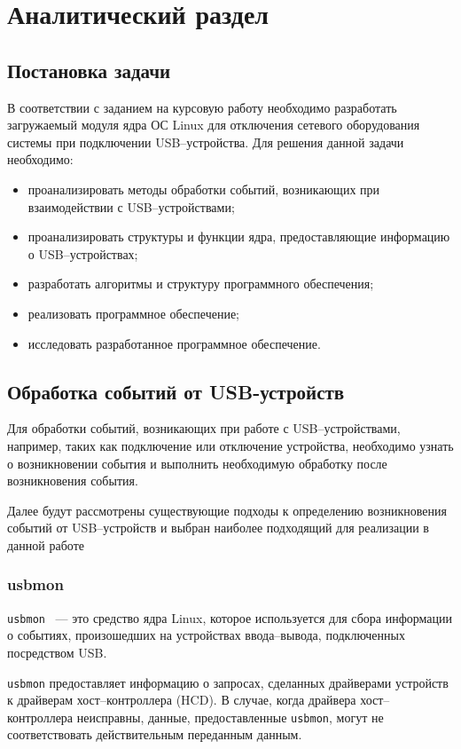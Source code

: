 \chapter{Аналитический раздел}

\section{Постановка задачи}

В соответствии с заданием на курсовую работу необходимо разработать загружаемый модуля ядра ОС Linux для отключения сетевого оборудования системы при подключении USB–устройства. Для решения данной задачи необходимо:

\begin{itemize}
	\item проанализировать методы обработки событий, возникающих при взаимодействии с USB–устройствами;
	\item проанализировать структуры и функции ядра, предоставляющие информацию о USB–устройствах;
	\item разработать алгоритмы и структуру программного обеспечения;
	\item реализовать программное обеспечение;
	\item исследовать разработанное программное обеспечение.
\end{itemize}

\section{Обработка событий от USB-устройств}

Для обработки событий, возникающих при работе с USB–устройствами, например, таких как подключение или отключение устройства, необходимо узнать о возникновении события и выполнить необходимую обработку после возникновения события.

Далее будут рассмотрены существующие подходы к определению возникновения событий от USB–устройств и выбран наиболее подходящий для реализации в данной работе

\subsection{usbmon}

\texttt{usbmon}~\cite{usbmon} --- это средство ядра Linux, которое используется для сбора информации о событиях, произошедших на устройствах ввода--вывода, подключенных посредством USB.

\texttt{usbmon} предоставляет информацию о запросах, сделанных драйверами устройств к драйверам хост--контроллера (HCD). В случае, когда драйвера хост--контроллера неисправны, данные, предоставленные \texttt{usbmon}, могут не соответствовать действительным переданным данным.

